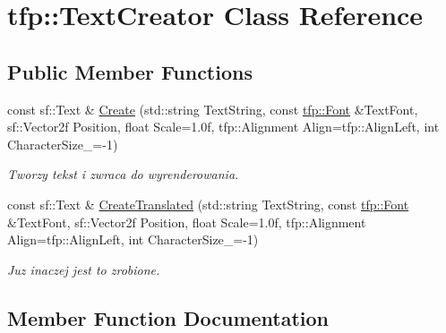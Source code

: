 \hypertarget{classtfp_1_1_text_creator}{}\section{tfp\+:\+:Text\+Creator Class Reference}
\label{classtfp_1_1_text_creator}
\subsection*{Public Member Functions}
\begin{DoxyCompactItemize}
\item 
\mbox{\label{classtfp_1_1_text_creator_ab868bc1c81c5b35067e85b823b2bb874}} 
const sf\+::\+Text \& \mbox{\hyperlink{classtfp_1_1_text_creator_ab868bc1c81c5b35067e85b823b2bb874}{Create}} (std\+::string Text\+String, const \mbox{\hyperlink{structtfp_1_1_font}{tfp\+::\+Font}} \&Text\+Font, sf\+::\+Vector2f Position, float Scale=1.\+0f, tfp\+::\+Alignment Align=tfp\+::\+Align\+Left, int Character\+Size\+\_\+=-\/1)
\begin{DoxyCompactList}\small\item\em Tworzy tekst i zwraca do wyrenderowania. \end{DoxyCompactList}\item 
const sf\+::\+Text \& \mbox{\hyperlink{classtfp_1_1_text_creator_a6abfed56b0c8f0866f78b4e9db443dd8}{Create\+Translated}} (std\+::string Text\+String, const \mbox{\hyperlink{structtfp_1_1_font}{tfp\+::\+Font}} \&Text\+Font, sf\+::\+Vector2f Position, float Scale=1.\+0f, tfp\+::\+Alignment Align=tfp\+::\+Align\+Left, int Character\+Size\+\_\+=-\/1)
\begin{DoxyCompactList}\small\item\em Juz inaczej jest to zrobione. \end{DoxyCompactList}\end{DoxyCompactItemize}


\subsection{Member Function Documentation}
\mbox{\label{classtfp_1_1_text_creator_a6abfed56b0c8f0866f78b4e9db443dd8}} 
